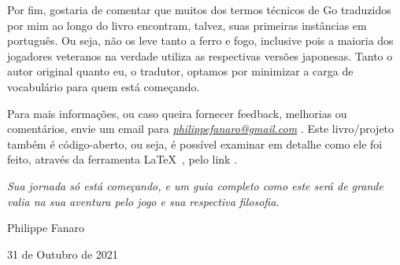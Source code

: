 \pagebreak

Por fim, gostaria de comentar que muitos dos termos técnicos de Go traduzidos por mim ao longo do livro encontram, talvez, suas primeiras instâncias em português. Ou seja, não os leve tanto a ferro e fogo, inclusive pois a maioria dos jogadores veteranos na verdade utiliza as respectivas versões japonesas. Tanto o autor original quanto eu, o tradutor, optamos por minimizar a carga de vocabulário para quem está começando.

\bigskip
\bigskip

Para mais informações, ou caso queira fornecer feedback, melhorias ou comentários, envie um email para \emph{\href{mailto:philippefanaro@gmail.com}{philippefanaro@gmail.com}} \cite{fanaro_email}. Este livro/projeto também é código-aberto, ou seja, é possível examinar em detalhe como ele foi feito, através da ferramenta \LaTeX~\cite{latex}, pelo link \href{https://github.com/FanaroEngineering/traducao_como_jogar_go}{}\cite{repo_github}.

\bigskip
\bigskip

\emph{Sua jornada só está começando, e um guia completo como este será de grande valia na sua aventura pelo jogo e sua respectiva filosofia.}

\bigskip
\bigskip

Philippe Fanaro

31 de Outubro de 2021